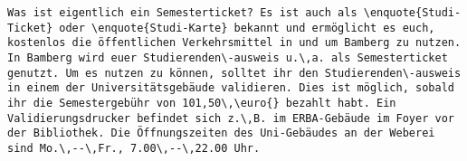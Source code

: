 \begin{verbatim}
Was ist eigentlich ein Semesterticket? Es ist auch als \enquote{Studi-Ticket} oder \enquote{Studi-Karte} bekannt und ermöglicht es euch, kostenlos die öffentlichen Verkehrsmittel in und um Bamberg zu nutzen. In Bamberg wird euer Studierenden\-ausweis u.\,a. als Semesterticket genutzt. Um es nutzen zu können, solltet ihr den Studierenden\-ausweis in einem der Universitätsgebäude validieren. Dies ist möglich, sobald ihr die Semestergebühr von 101,50\,\euro{} bezahlt habt. Ein Validierungsdrucker befindet sich z.\,B. im ERBA-Gebäude im Foyer vor der Bibliothek. Die Öffnungszeiten des Uni-Gebäudes an der Weberei sind Mo.\,--\,Fr., 7.00\,--\,22.00 Uhr. 
\end{verbatim}

